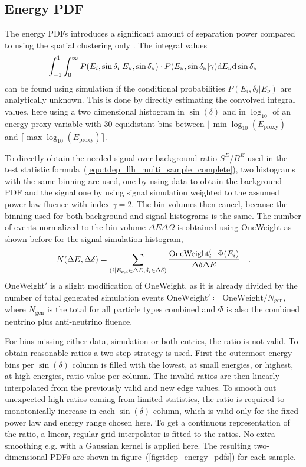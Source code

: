 \subsection*{Energy PDF}
The energy PDFs introduces a significant amount of separation power compared to using the spatial clustering only \cite{Braun:2008bg}.
The integral values
\begin{equation}
  \int_{-1}^{1}\int_0^\infty
    P(E_i,\sin{\delta_i}|E_\nu, \sin{\delta_\nu})\cdot
    P(E_\nu, \sin{\delta_\nu}|\gamma) \mathrm{d}E_\nu\mathrm{d}\sin{\delta_\nu}
\end{equation}
can be found using simulation if the conditional probabilities $P(E_i,\delta_i|E_\nu)$ are analytically unknown.
This is done by directly estimating the convolved integral values, here using a two dimensional histogram in $\sin(\delta)$ and in $\log_{10}$ of an energy proxy variable with $\num{30}$ equidistant bins between $\lfloor \min\log_{10}(E_\text{proxy}) \rfloor$ and $\lceil \max\log_{10}(E_\text{proxy}) \rceil$.

To directly obtain the needed signal over background ratio $S^E / B^E$ used in the test statistic formula~(\ref{equ:tdep_llh_multi_sample_complete}), two histograms with the same binning are used, one by using data to obtain the background PDF and the signal one by using signal simulation weighted to the assumed power law fluence with index $\gamma = 2$.
The bin volumes then cancel, because the binning used for both background and signal histograms is the same.
The number of events normalized to the bin volume $\Delta E\Delta\Omega$ is obtained using OneWeight as shown before for the signal simulation histogram,
\begin{equation}
  \label{equ:nevts_from_oneweight}
  N(\Delta E, \Delta\delta)
  = \sum_{(i|E_{\nu,i}\in\Delta E, \delta_i\in\Delta\delta)}
    \frac{\text{OneWeight}'_i \cdot \Phi(E_i)}{\Delta\delta \Delta E}
  \quad\text{.}
\end{equation}
OneWeight$'$ is a slight modification of OneWeight, as it is already divided by the number of total generated simulation events $\text{OneWeight}'\coloneqq\text{OneWeight}/N_\text{gen}$, where $N_\text{gen}$ is the total for all particle types combined and $\Phi$ is also the combined neutrino plus anti-neutrino fluence.

For bins missing either data, simulation or both entries, the ratio is not valid.
To obtain reasonable ratios a two-step strategy is used.
First the outermost energy bins per $\sin(\delta)$ column is filled with the lowest, at small energies, or highest, at high energies, ratio value per column.
The invalid ratios are then linearly interpolated from the previously valid and new edge values.
To smooth out unexpected high ratios coming from limited statistics, the ratio is required to monotonically increase in each $\sin(\delta)$ column, which is valid only for the fixed power law and energy range chosen here.
To get a continuous representation of the ratio, a linear, regular grid interpolator is fitted to the ratios.
No extra smoothing e.g. with a Gaussian kernel is applied here.
The resulting two-dimensional PDFs are shown in figure~(\ref{fig:tdep_energy_pdfs}) for each sample.

